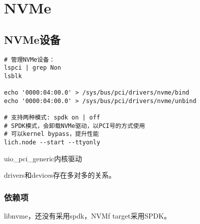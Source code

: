 \chapter{NVMe}

\section{NVMe设备}

\begin{lstlisting}
# 管理NVMe设备：
lspci | grep Non
lsblk

echo '0000:04:00.0' > /sys/bus/pci/drivers/nvme/bind
echo '0000:04:00.0' > /sys/bus/pci/drivers/nvme/unbind

# 支持两种模式: spdk on | off
# SPDK模式，会卸载NVMe驱动，以PCI号的方式使用
# 可以kernel bypass，提升性能
lich.node --start --ttyonly
\end{lstlisting}

uio\_pci\_generic内核驱动

drivers和devices存在多对多的关系。

\subsection{依赖项}

libnvme，还没有采用spdk，NVMf target采用SPDK。
